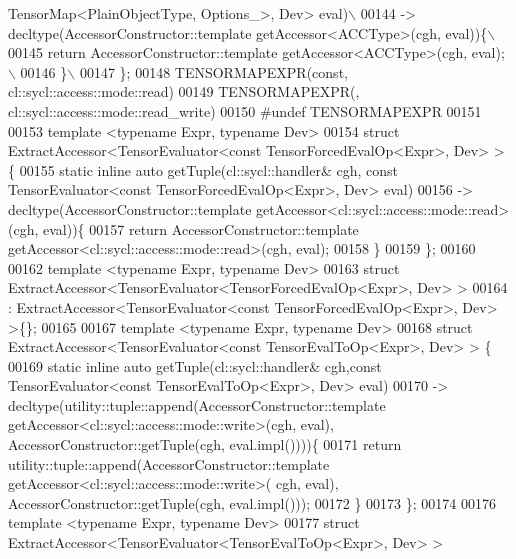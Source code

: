 \begin{DoxyCode}
{       TensorMap<PlainObjectType, Options\_>, Dev> eval)\(\backslash\)}
00144 \textcolor{preprocessor}{  -> decltype(AccessorConstructor::template getAccessor<ACCType>(cgh, eval))\{\(\backslash\)}
00145 \textcolor{preprocessor}{    return AccessorConstructor::template getAccessor<ACCType>(cgh, eval);\(\backslash\)}
00146 \textcolor{preprocessor}{  \}\(\backslash\)}
00147 \textcolor{preprocessor}{\};}
00148 TENSORMAPEXPR(\textcolor{keyword}{const}, cl::sycl::access::mode::read)
00149 TENSORMAPEXPR(, cl::sycl::access::mode::read\_write)
00150 \textcolor{preprocessor}{#undef TENSORMAPEXPR}
00151 
00153 \textcolor{keyword}{template} <\textcolor{keyword}{typename} Expr, \textcolor{keyword}{typename} Dev>
00154 \textcolor{keyword}{struct }ExtractAccessor<TensorEvaluator<const TensorForcedEvalOp<Expr>, Dev> > \{
00155   \textcolor{keyword}{static} \textcolor{keyword}{inline} \textcolor{keyword}{auto} getTuple(cl::sycl::handler& cgh, \textcolor{keyword}{const} TensorEvaluator<\textcolor{keyword}{const} TensorForcedEvalOp<Expr>,
       Dev> eval)
00156   -> decltype(AccessorConstructor::template getAccessor<cl::sycl::access::mode::read>(cgh, eval))\{
00157     \textcolor{keywordflow}{return} AccessorConstructor::template getAccessor<cl::sycl::access::mode::read>(cgh, eval);
00158   \}
00159 \};
00160 
00162 \textcolor{keyword}{template} <\textcolor{keyword}{typename} Expr, \textcolor{keyword}{typename} Dev>
00163 \textcolor{keyword}{struct }ExtractAccessor<TensorEvaluator<TensorForcedEvalOp<Expr>, Dev> >
00164 : ExtractAccessor<TensorEvaluator<const TensorForcedEvalOp<Expr>, Dev> >\{\};
00165 
00167 \textcolor{keyword}{template} <\textcolor{keyword}{typename} Expr, \textcolor{keyword}{typename} Dev>
00168 \textcolor{keyword}{struct }ExtractAccessor<TensorEvaluator<const TensorEvalToOp<Expr>, Dev> > \{
00169   \textcolor{keyword}{static} \textcolor{keyword}{inline} \textcolor{keyword}{auto} getTuple(cl::sycl::handler& cgh,\textcolor{keyword}{const} TensorEvaluator<\textcolor{keyword}{const} TensorEvalToOp<Expr>, Dev>
       eval)
00170   -> decltype(utility::tuple::append(AccessorConstructor::template 
      getAccessor<cl::sycl::access::mode::write>(cgh, eval), AccessorConstructor::getTuple(cgh, eval.impl())))\{
00171     \textcolor{keywordflow}{return} utility::tuple::append(AccessorConstructor::template getAccessor<cl::sycl::access::mode::write>(
      cgh, eval), AccessorConstructor::getTuple(cgh, eval.impl()));
00172   \}
00173 \};
00174 
00176 \textcolor{keyword}{template} <\textcolor{keyword}{typename} Expr, \textcolor{keyword}{typename} Dev>
00177 \textcolor{keyword}{struct }ExtractAccessor<TensorEvaluator<TensorEvalToOp<Expr>, Dev> >

\end{DoxyCode}

